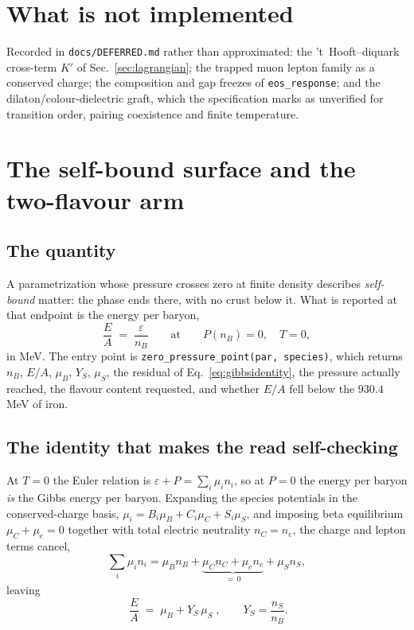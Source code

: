 \documentclass[aps,prc,onecolumn,superscriptaddress,nofootinbib,10pt]{revtex4-2}
\begin{document}
\section{What is not implemented}
\label{sec:notimplemented}

Recorded in \texttt{docs/DEFERRED.md} rather than approximated:
the 't~Hooft--diquark cross-term $K'$ of
Sec.~\ref{sec:lagrangian}; the trapped muon lepton family as a conserved
charge; the composition and gap freezes of \texttt{eos\_response}; and the
dilaton/colour-dielectric graft, which the specification marks as unverified
for transition order, pairing coexistence and finite temperature.

\section{The self-bound surface and the two-flavour arm}
\label{sec:zeropressure}

\subsection{The quantity}

A parametrization whose pressure crosses zero at finite density describes
\emph{self-bound} matter: the phase ends there, with no crust below it. What is
reported at that endpoint is the energy per baryon,
%
\begin{equation}
  \frac{E}{A} \;=\; \frac{\varepsilon}{n_B}
  \qquad\text{at}\qquad P(n_B) = 0,\quad T = 0 ,
\end{equation}
%
in MeV. The entry point is \texttt{zero\_pressure\_point(par, species)}, which
returns $n_B$, $E/A$, $\mu_B$, $Y_S$, $\mu_S$, the residual of
Eq.~\eqref{eq:gibbsidentity}, the pressure actually reached, the flavour
content requested, and whether $E/A$ fell below the $930.4\;$MeV of iron.

\subsection{The identity that makes the read self-checking}

At $T = 0$ the Euler relation is $\varepsilon + P = \sum_i \mu_i n_i$, so at
$P = 0$ the energy per baryon \emph{is} the Gibbs energy per baryon. Expanding
the species potentials in the conserved-charge basis,
$\mu_i = B_i\mu_B + C_i\mu_C + S_i\mu_S$, and imposing beta equilibrium
$\mu_C + \mu_e = 0$ together with total electric neutrality $n_C = n_e$, the
charge and lepton terms cancel,
%
\begin{equation}
  \sum_i \mu_i n_i
    = \mu_B n_B + \underbrace{\mu_C n_C + \mu_e n_e}_{=\,0} + \mu_S n_S ,
\end{equation}
%
leaving
%
\begin{equation}
  \boxed{\;\frac{E}{A} \;=\; \mu_B + Y_S\,\mu_S\;} ,
  \qquad Y_S = \frac{n_S}{n_B} .
  \label{eq:gibbsidentity}
\end{equation}
\end{document}
